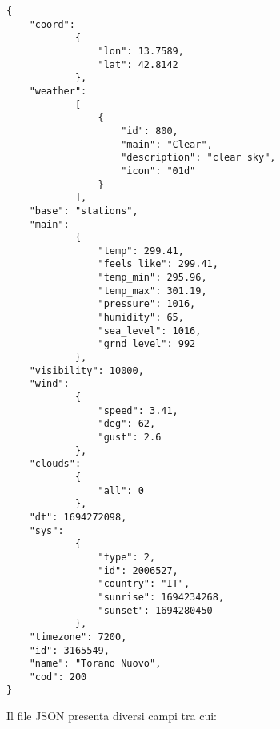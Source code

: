 \begin{lstlisting}[caption=File JSON restituito dall'API OpenWeather, label=lst:openweatherjson, captionpos=b]
{
    "coord":
            {
                "lon": 13.7589,
                "lat": 42.8142
            },
    "weather":
            [
                {
                    "id": 800,
                    "main": "Clear",
                    "description": "clear sky",
                    "icon": "01d"
                }
            ],
    "base": "stations",
    "main":
            {
                "temp": 299.41,
                "feels_like": 299.41,
                "temp_min": 295.96,
                "temp_max": 301.19,
                "pressure": 1016,
                "humidity": 65,
                "sea_level": 1016,
                "grnd_level": 992
            },
    "visibility": 10000,
    "wind":
            {
                "speed": 3.41,
                "deg": 62,
                "gust": 2.6
            },
    "clouds":
            {
                "all": 0
            },
    "dt": 1694272098,
    "sys":
            {
                "type": 2,
                "id": 2006527,
                "country": "IT",
                "sunrise": 1694234268,
                "sunset": 1694280450
            },
    "timezone": 7200,
    "id": 3165549,
    "name": "Torano Nuovo",
    "cod": 200
} 
\end{lstlisting}

Il file JSON presenta diversi campi tra cui:


